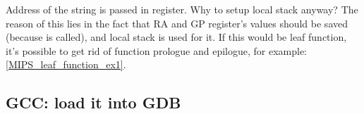 Address of the string is passed in register. 
Why to setup local stack anyway?
The reason of this lies in the fact that \ac{RA} and GP register's values should be saved (because \printf
is called), and local stack is used for it.
If this would be \gls{leaf function}, it's possible to get rid of function prologue and epilogue,
for example: \ref{MIPS_leaf_function_ex1}.

\subsection{\Optimizing GCC: load it into GDB}



\fi
